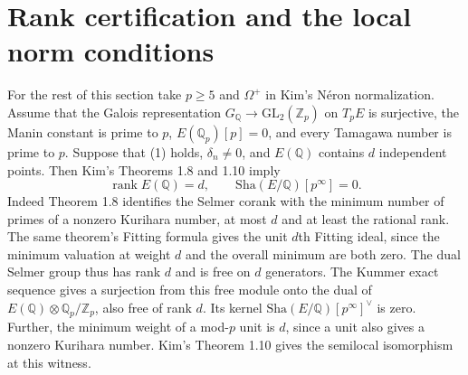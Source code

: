 \documentclass[11pt]{article}
\newcommand{\Q}{\mathbb Q}
\newcommand{\Z}{\mathbb Z}
\newcommand{\Sha}{\mathrm{Sha}}
\begin{document}
\section{Rank certification and the local norm conditions}
For the rest of this section take $p\ge5$ and $\Omega^+$ in Kim's
N\'eron normalization. Assume that the Galois representation
$G_{\Q}\to\mathrm{GL}_2(\Z_p)$ on $T_pE$ is surjective, the Manin
constant is prime to $p$, $E(\Q_p)[p]=0$, and every Tamagawa number is
prime to $p$. Suppose that (1) holds, $\delta_n\ne0$, and $E(\Q)$
contains $d$ independent points. Then Kim's Theorems 1.8 and 1.10
\cite{Kim} imply
\[
 \operatorname{rank}E(\Q)=d,\qquad \Sha(E/\Q)[p^\infty]=0 .
 \tag{6}
\]
Indeed Theorem 1.8 identifies the Selmer corank with the minimum number
of primes of a nonzero Kurihara number, at most $d$ and at least the
rational rank. The same theorem's Fitting formula gives the unit
$d$th Fitting ideal, since the minimum valuation at weight $d$ and
the overall minimum are both zero. The dual Selmer group thus has rank
$d$ and is free on $d$ generators. The Kummer exact sequence gives
a surjection from this free module onto the dual of
$E(\Q)\otimes\Q_p/\Z_p$, also free of rank $d$. Its kernel
$\Sha(E/\Q)[p^\infty]^\vee$ is zero. Further, the minimum weight of a mod-$p$ unit is
$d$, since a unit also gives a nonzero Kurihara number. Kim's
Theorem 1.10 gives the semilocal isomorphism at this witness.
\end{document}
